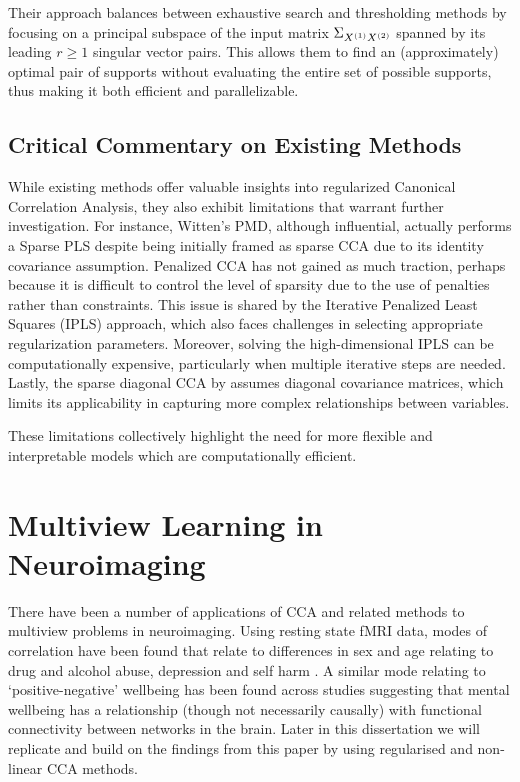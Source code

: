 Their approach balances between exhaustive search and thresholding methods by focusing on a principal subspace of the input matrix $\Sigma_{X^{(1)}X^{(2)}}$ spanned by its leading \( r \geq 1 \) singular vector pairs.
This allows them to find an (approximately) optimal pair of supports without evaluating the entire set of possible supports, thus making it both efficient and parallelizable.

\subsection{Critical Commentary on Existing Methods}

While existing methods offer valuable insights into regularized Canonical Correlation Analysis, they also exhibit limitations that warrant further investigation.
For instance, Witten's PMD, although influential, actually performs a Sparse PLS despite being initially framed as sparse CCA due to its identity covariance assumption. Penalized CCA \cite{parkhomenko2009sparse} has not gained as much traction, perhaps because it is difficult to control the level of sparsity due to the use of penalties rather than constraints.
This issue is shared by the Iterative Penalized Least Squares (IPLS) approach, which also faces challenges in selecting appropriate regularization parameters.
Moreover, solving the high-dimensional IPLS can be computationally expensive, particularly when multiple iterative steps are needed. Lastly, the sparse diagonal CCA by \cite{asteris2016simple} assumes diagonal covariance matrices, which limits its applicability in capturing more complex relationships between variables.

These limitations collectively highlight the need for more flexible and interpretable models which are
computationally efficient.

\section{Multiview Learning in Neuroimaging}

There have been a number of applications of CCA and related methods to multiview problems in neuroimaging.
Using resting state fMRI data, modes of correlation have been found that relate to differences in sex and age relating to drug and alcohol abuse, depression and self harm \cite{mihalik2019brain}.
A similar mode relating to `positive-negative' wellbeing has been found across studies \cite{smith2015positive} suggesting that mental wellbeing has a relationship (though not necessarily causally) with functional connectivity between networks in the brain.
Later in this dissertation we will replicate and build on the findings from this paper by using regularised and non-linear CCA methods.

